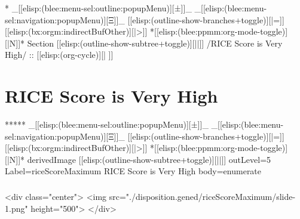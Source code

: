 \begin{whenOrg}
*  _[[elisp:(blee:menu-sel:outline:popupMenu)][±]]_ _[[elisp:(blee:menu-sel:navigation:popupMenu)][Ξ]]_ [[elisp:(outline-show-branches+toggle)][|=]] [[elisp:(bx:orgm:indirectBufOther)][|>]] *[[elisp:(blee:ppmm:org-mode-toggle)][|N]]*  Section    [[elisp:(outline-show-subtree+toggle)][||]]   /RICE Score is Very High/ ::  [[elisp:(org-cycle)][| ]]
\end{whenOrg}

\section{RICE Score is Very High}


\begin{whenOrg}
*****  _[[elisp:(blee:menu-sel:outline:popupMenu)][±]]_ _[[elisp:(blee:menu-sel:navigation:popupMenu)][Ξ]]_ [[elisp:(outline-show-branches+toggle)][|=]] [[elisp:(bx:orgm:indirectBufOther)][|>]] *[[elisp:(blee:ppmm:org-mode-toggle)][|N]]*  derivedImage [[elisp:(outline-show-subtree+toggle)][||]] outLevel=5 Label=riceScoreMaximum RICE Score is Very High body=enumerate

\end{whenOrg}

\begin{htmlonly}

\begin{frame}[fragile,plain,label=riceScoreMaximum]
    \frametitle{}
    \framesubtitle{}
    \begin{rawhtml}
<div class="center">
<img src="./disposition.gened/riceScoreMaximum/slide-1.png" height="500">
</div>
    \end{rawhtml}
\end{frame}
\end{htmlonly}


